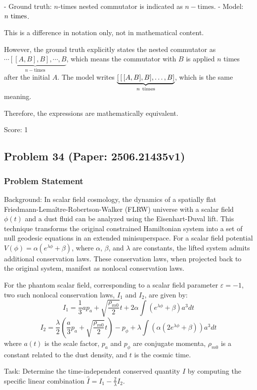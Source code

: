 \documentclass[10pt]{article}
\begin{document}
- Ground truth: \( n \)-times nested commutator is indicated as \( n-\mathrm{times} \).
- Model: \( n \ {\rm times} \).

This is a difference in notation only, not in mathematical content.

However, the ground truth explicitly states the nested commutator as \( \underbrace{\cdots[[A,B],B],\cdots,B}_{n-\mathrm{times}} \), which means the commutator with \( B \) is applied \( n \) times after the initial \( A \). The model writes \( \underbrace{[\,[\,[A,B],B],\dots ,B]}_{n\ {\rm times}} \), which is the same meaning.

Therefore, the expressions are mathematically equivalent.

Score: 1

\newpage
\subsection*{Problem 34 (Paper: 2506.21435v1)}
\subsubsection*{Problem Statement}
Background:
In scalar field cosmology, the dynamics of a spatially flat Friedmann-Lemaître-Robertson-Walker (FLRW) universe with a scalar field $\phi(t)$ and a dust fluid can be analyzed using the Eisenhart-Duval lift. This technique transforms the original constrained Hamiltonian system into a set of null geodesic equations in an extended minisuperspace. For a scalar field potential $V(\phi) = \alpha(e^{\lambda\phi} + \beta)$, where $\alpha$, $\beta$, and $\lambda$ are constants, the lifted system admits additional conservation laws. These conservation laws, when projected back to the original system, manifest as nonlocal conservation laws.

For the phantom scalar field, corresponding to a scalar field parameter $\varepsilon = -1$, two such nonlocal conservation laws, $I_1$ and $I_2$, are given by:
$$I_{1} = \frac{1}{3}ap_{a}+\sqrt{\frac{\rho _{m0}}{2}}t+2\alpha \int \left( e^{\lambda \phi }+\beta \right) a^{3}dt$$
$$I_{2} = \frac{\lambda }{2}\left( \frac{a}{3}p_{a}+\sqrt{\frac{\rho _{m0}}{2}}t\right) - p_{\phi }+\lambda \int \left( \alpha \left( 2e^{\lambda \phi }+\beta \right) \right) a^{3}dt$$
where $a(t)$ is the scale factor, $p_a$ and $p_\phi$ are conjugate momenta, $\rho_{m0}$ is a constant related to the dust density, and $t$ is the cosmic time.

Task:
Determine the time-independent conserved quantity $\hat{I}$ by computing the specific linear combination $\hat{I} = I_1 - \frac{2}{\lambda}I_2$.
\end{document}
